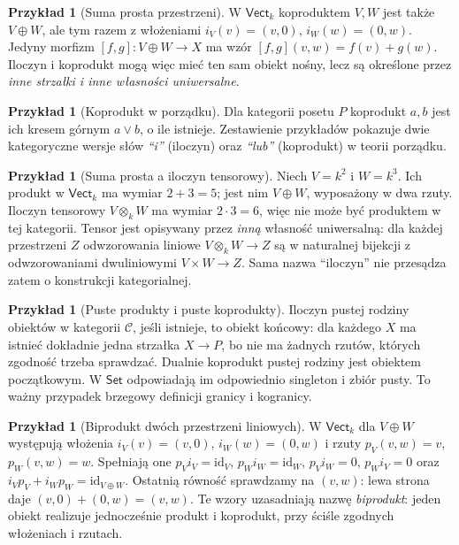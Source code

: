 \documentclass[11pt,a4paper]{article}
\numberwithin{equation}{section}
\theoremstyle{plain}
\theoremstyle{definition}
\newtheorem{przyklad}[twierdzenie]{Przykład}
\theoremstyle{remark}
\newcommand{\cat}[1]{\mathsf{#1}}
\newcommand{\Set}{\cat{Set}}
\newcommand{\Vect}{\cat{Vect}}
\newcommand{\id}{\mathrm{id}}
\begin{document}
\begin{przyklad}[Suma prosta przestrzeni]
W $\Vect_k$ koproduktem $V,W$ jest także $V\oplus W$, ale tym razem z włożeniami $i_V(v)=(v,0)$, $i_W(w)=(0,w)$. Jedyny morfizm $[f,g]:V\oplus W\to X$ ma wzór $[f,g](v,w)=f(v)+g(w)$. Iloczyn i koprodukt mogą więc mieć ten sam obiekt nośny, lecz są określone przez \emph{inne strzałki i inne własności uniwersalne}.
\end{przyklad}

\begin{przyklad}[Koprodukt w porządku]
Dla kategorii posetu $P$ koprodukt $a,b$ jest ich kresem górnym $a\vee b$, o ile istnieje. Zestawienie przykładów pokazuje dwie kategoryczne wersje słów \emph{``i''} (iloczyn) oraz \emph{``lub''} (koprodukt) w teorii porządku.
\end{przyklad}


\begin{przyklad}[Suma prosta a iloczyn tensorowy]
Niech $V=k^2$ i $W=k^3$. Ich produkt w $\Vect_k$ ma wymiar $2+3=5$; jest nim $V\oplus W$, wyposażony w dwa rzuty. Iloczyn tensorowy $V\otimes_k W$ ma wymiar $2\cdot3=6$, więc nie może być produktem w tej kategorii. Tensor jest opisywany przez \emph{inną} własność uniwersalną: dla każdej przestrzeni $Z$ odwzorowania liniowe $V\otimes_k W\to Z$ są w naturalnej bijekcji z odwzorowaniami dwuliniowymi $V\times W\to Z$. Sama nazwa ``iloczyn'' nie przesądza zatem o konstrukcji kategorialnej.
\end{przyklad}

\begin{przyklad}[Puste produkty i puste koprodukty]
Iloczyn pustej rodziny obiektów w kategorii $\mathcal C$, jeśli istnieje, to obiekt końcowy: dla każdego $X$ ma istnieć dokładnie jedna strzałka $X\to P$, bo nie ma żadnych rzutów, których zgodność trzeba sprawdzać. Dualnie koprodukt pustej rodziny jest obiektem początkowym. W $\Set$ odpowiadają im odpowiednio singleton i zbiór pusty. To ważny przypadek brzegowy definicji granicy i kogranicy.
\end{przyklad}

\begin{przyklad}[Biprodukt dwóch przestrzeni liniowych]
W $\Vect_k$ dla $V\oplus W$ występują włożenia $i_V(v)=(v,0)$, $i_W(w)=(0,w)$ i rzuty $p_V(v,w)=v$, $p_W(v,w)=w$. Spełniają one $p_Vi_V=\id_V$, $p_Wi_W=\id_W$, $p_Vi_W=0$, $p_Wi_V=0$ oraz $i_Vp_V+i_Wp_W=\id_{V\oplus W}$. Ostatnią równość sprawdzamy na $(v,w)$: lewa strona daje $(v,0)+(0,w)=(v,w)$. Te wzory uzasadniają nazwę \emph{biprodukt}: jeden obiekt realizuje jednocześnie produkt i koprodukt, przy ściśle zgodnych włożeniach i rzutach.
\end{przyklad}
\end{document}
